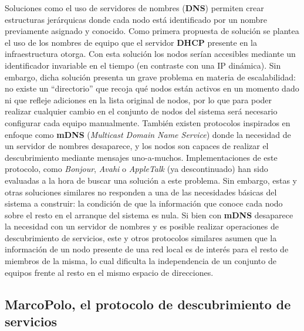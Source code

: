 Soluciones como el uso de servidores de nombres (\textbf{DNS}) permiten crear estructuras jerárquicas donde cada nodo está identificado por un nombre previamente asignado y conocido. Como primera propuesta de solución se plantea el uso de los nombres de equipo que el servidor \textbf{DHCP} presente en la infraestructura otorga. Con esta solución los nodos serían accesibles mediante un identificador invariable en el tiempo (en contraste con una IP dinámica). Sin embargo, dicha solución presenta un grave problema en materia de escalabilidad: no existe un ``directorio'' que recoja qué nodos están activos en un momento dado ni que refleje adiciones en la lista original de nodos, por lo que para poder realizar cualquier cambio en el conjunto de nodos del sistema será necesario configurar cada equipo manualmente. También existen protocolos inspirados en enfoque como \textbf{mDNS} (\textit{Multicast Domain Name Service}) donde la necesidad de un servidor de nombres desaparece, y los nodos son capaces de realizar el descubrimiento mediante mensajes uno-a-muchos\cite{rfc6762}. Implementaciones de este protocolo, como \textit{Bonjour}, \textit{Avahi} o \textit{AppleTalk} (ya descontinuado) han sido evaluadas a la hora de buscar una solución a este problema. Sin embargo, estas y otras soluciones similares no responden a una de las necesidades básicas del sistema a construir: la condición de que la información que conoce cada nodo sobre el resto en el arranque del sistema es nula. Si bien con \textbf{mDNS} desaparece la necesidad con un servidor de nombres y es posible realizar operaciones de descubrimiento de servicios, este y otros protocolos similares asumen que la información de un nodo presente de una red local es de interés para el resto de miembros de la misma, lo cual dificulta la independencia de un conjunto de equipos frente al resto en el mismo espacio de direcciones.


\subsection{MarcoPolo, el protocolo de descubrimiento de servicios}
\label{marcopolo}


